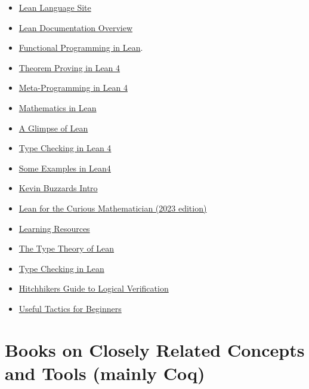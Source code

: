 \documentclass{book}
\providecommand{\tightlist}{%
  \setlength{\itemsep}{0pt}\setlength{\parskip}{0pt}}
\begin{document}
\begin{itemize}
\tightlist
\item
  \href{https://lean-lang.org/}{Lean Language Site}
\item
  \href{https://lean-lang.org/lean4/doc/}{Lean Documentation Overview}
\item
  \href{https://leanprover.github.io/functional_programming_in_lean/}{Functional Programming in Lean}.
\item
  \href{https://leanprover.github.io/theorem_proving_in_lean4/induction_and_recursion.html}{Theorem Proving in Lean 4}
\item
  \href{https://leanprover-community.github.io/lean4-metaprogramming-book/}{Meta-Programming in Lean 4}
\item
  \href{https://leanprover-community.github.io/mathematics_in_lean/mathematics_in_lean.pdf}{Mathematics in Lean}
\item
  \href{https://github.com/PatrickMassot/GlimpseOfLean}{A Glimpse of Lean}
\item
  \href{https://ammkrn.github.io/type_checking_in_lean4/}{Type Checking in Lean 4}
\item
  \href{https://lean-lang.org/lean4/doc/examples.html}{Some Examples in Lean4}
\item
  \href{https://leanprover-community.github.io/lean-perfectoid-spaces/type_theory.html}{Kevin Buzzard\textquotesingle s Intro}
\item
  \href{https://lftcm2023.github.io/tutorial/index.html}{Lean for the Curious Mathematician (2023 edition)}
\item
  \href{https://leanprover-community.github.io/learn.html}{Learning Resources}
\item
  \href{https://github.com/digama0/lean-type-theory/releases}{The Type Theory of Lean}
\item
  \href{https://ammkrn.github.io/type_checking_in_lean4/}{Type Checking in Lean}
\item
  \href{https://raw.githubusercontent.com/blanchette/logical_verification_2023/main/hitchhikers_guide.pdf}{Hitchhikers Guide to Logical Verification}
\item
  \href{https://github.com/madvorak/lean4-tactics}{Useful Tactics for Beginners}
\end{itemize}

\hypertarget{pandoc.profile.debug__pandoc__debug__src__resources.md__books-on-closely-related-concepts-and-tools-mainly-coq}{%
\section*{Books on Closely Related Concepts and Tools (mainly Coq)}\label{pandoc.profile.debug__pandoc__debug__src__resources.md__books-on-closely-related-concepts-and-tools-mainly-coq}}
\end{document}

